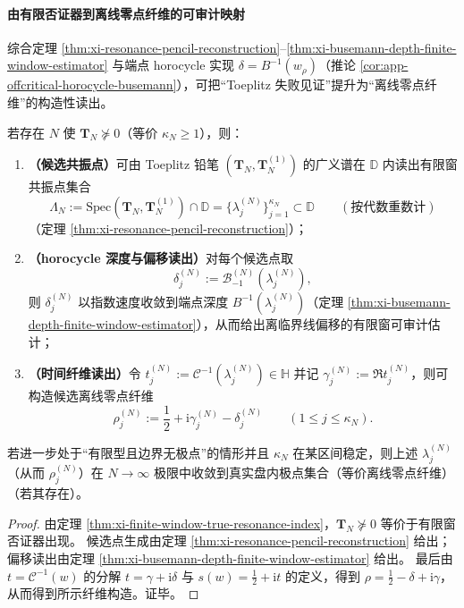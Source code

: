 \paragraph{由有限否证器到离线零点纤维的可审计映射}
综合定理 \ref{thm:xi-resonance-pencil-reconstruction}--\ref{thm:xi-busemann-depth-finite-window-estimator} 与端点 horocycle 实现
\(\delta=B^{-1}(w_\rho)\)（推论 \ref{cor:app-offcritical-horocycle-busemann}），可把“Toeplitz 失败见证”提升为“离线零点纤维”的构造性读出。

\begin{theorem}\label{thm:xi-finite-witness-to-offline-fiber}
若存在 \(N\) 使 \(\mathbf{T}_N\nsucceq 0\)（等价 \(\kappa_N\ge 1\)），则：
\begin{enumerate}
  \item \textbf{（候选共振点）}可由 Toeplitz 铅笔 \((\mathbf{T}_N,\mathbf{T}_N^{(1)})\) 的广义谱在 \(\mathbb{D}\) 内读出有限窗共振点集合
  \[
  \Lambda_N:=\mathrm{Spec}(\mathbf{T}_N,\mathbf{T}_N^{(1)})\cap\mathbb{D}
  =\{\lambda^{(N)}_j\}_{j=1}^{\kappa_N}\subset\mathbb{D}
  \qquad(\text{按代数重数计})
  \]
  （定理 \ref{thm:xi-resonance-pencil-reconstruction}）；
  \item \textbf{（horocycle 深度与偏移读出）}对每个候选点取
  \[
  \delta^{(N)}_j:=\mathcal{B}^{(N)}_{-1}(\lambda^{(N)}_j),
  \]
  则 \(\delta^{(N)}_j\) 以指数速度收敛到端点深度 \(B^{-1}(\lambda^{(N)}_j)\)（定理 \ref{thm:xi-busemann-depth-finite-window-estimator}），从而给出离临界线偏移的有限窗可审计估计；
  \item \textbf{（时间纤维读出）}令 \(t^{(N)}_j:=\mathcal{C}^{-1}(\lambda^{(N)}_j)\in\mathbb{H}\) 并记 \(\gamma^{(N)}_j:=\Re t^{(N)}_j\)，则可构造候选离线零点纤维
  \[
  \rho^{(N)}_j:=\frac12+\mathrm{i}\gamma^{(N)}_j-\delta^{(N)}_j\qquad(1\le j\le \kappa_N).
  \]
\end{enumerate}
若进一步处于“有限型且边界无极点”的情形并且 \(\kappa_N\) 在某区间稳定，则上述 \(\lambda^{(N)}_j\)（从而 \(\rho^{(N)}_j\)）在 \(N\to\infty\) 极限中收敛到真实盘内极点集合（等价离线零点纤维）（若其存在）。
\end{theorem}

\begin{proof}
由定理 \ref{thm:xi-finite-window-true-resonance-index}，\(\mathbf{T}_N\nsucceq 0\) 等价于有限窗否证器出现。
候选点生成由定理 \ref{thm:xi-resonance-pencil-reconstruction} 给出；偏移读出由定理 \ref{thm:xi-busemann-depth-finite-window-estimator} 给出。
最后由 \(t=\mathcal{C}^{-1}(w)\) 的分解 \(t=\gamma+\mathrm{i}\delta\) 与 \(s(w)=\tfrac12+\mathrm{i}t\) 的定义，得到 \(\rho=\tfrac12-\delta+\mathrm{i}\gamma\)，从而得到所示纤维构造。证毕。
\end{proof}


